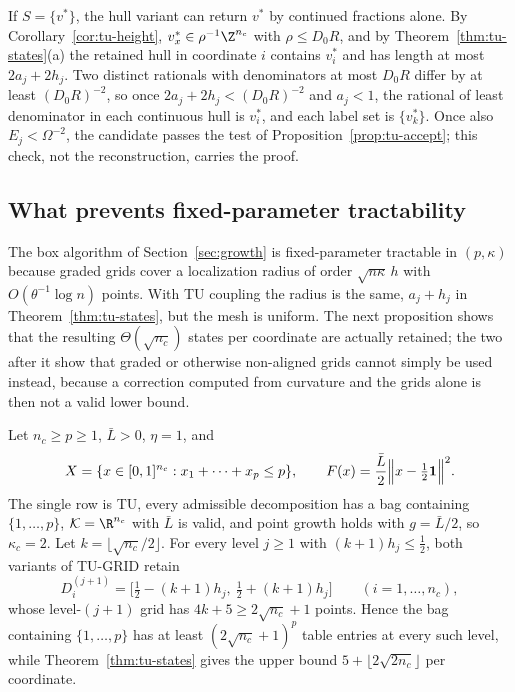 \begin{remark}\label{rem:tu-cf}
If $S=\{v^*\}$, the hull variant can return $v^*$ by continued fractions
alone. By Corollary~\ref{cor:tu-height}, $v^*_x\in\rho^{-1}\Z^{n_c}$ with
$\rho\le D_0R$, and by Theorem~\ref{thm:tu-states}(a) the retained hull in
coordinate $i$ contains $v^*_i$ and has length at most $2a_j+2h_j$. Two
distinct rationals with denominators at most $D_0R$ differ by at least
$(D_0R)^{-2}$, so once $2a_j+2h_j<(D_0R)^{-2}$ and $a_j<1$, the rational of
least denominator in each continuous hull is $v^*_i$, and each label set is
$\{v^*_k\}$. Once also $E_j<\Omega^{-2}$, the candidate passes the test of
Proposition~\ref{prop:tu-accept}; this check, not the reconstruction, carries
the proof.
\end{remark}

\subsection{What prevents fixed-parameter tractability}\label{sec:tu-limits}

The box algorithm of Section~\ref{sec:growth} is fixed-parameter tractable in
$(p,\kappa)$ because graded grids cover a localization radius of order
$\sqrt{n\kappa}\,h$ with $O(\theta^{-1}\log n)$ points. With TU coupling the
radius is the same, $a_j+h_j$ in Theorem~\ref{thm:tu-states}, but the mesh is
uniform. The next proposition shows that the resulting $\Theta(\sqrt{n_c})$
states per coordinate are actually retained; the two after it show that
graded or otherwise non-aligned grids cannot simply be used instead, because
a correction computed from curvature and the grids alone is then not a valid
lower bound.

\begin{proposition}\label{prop:tu-tight}
Let $n_c\ge p\ge1$, $\bar L>0$, $\eta=1$, and
\[
X=\{x\in[0,1]^{n_c}:x_1+\dots+x_p\le p\},\qquad
F(x)=\frac{\bar L}2\Bigl\lVert x-\tfrac12\mathbf 1\Bigr\rVert^2 .
\]
The single row is TU, every admissible decomposition has a bag containing
$\{1,\dots,p\}$, $\mathcal K=\R^{n_c}$ with $\bar L$ is valid, and point
growth holds with $g=\bar L/2$, so $\kappa_c=2$. Let
$k=\lfloor\sqrt{n_c}/2\rfloor$. For every level $j\ge1$ with
$(k+1)h_j\le\frac12$, both variants of TU-GRID retain
\[
D^{(j+1)}_i=\bigl[\tfrac12-(k+1)h_j,\ \tfrac12+(k+1)h_j\bigr]\qquad(i=1,\dots,n_c),
\]
whose level-$(j+1)$ grid has $4k+5\ge2\sqrt{n_c}+1$ points. Hence the bag
containing $\{1,\dots,p\}$ has at least $(2\sqrt{n_c}+1)^p$ table entries at
every such level, while Theorem~\ref{thm:tu-states} gives the upper bound
$5+\lfloor2\sqrt{2n_c}\rfloor$ per coordinate.
\end{proposition}

